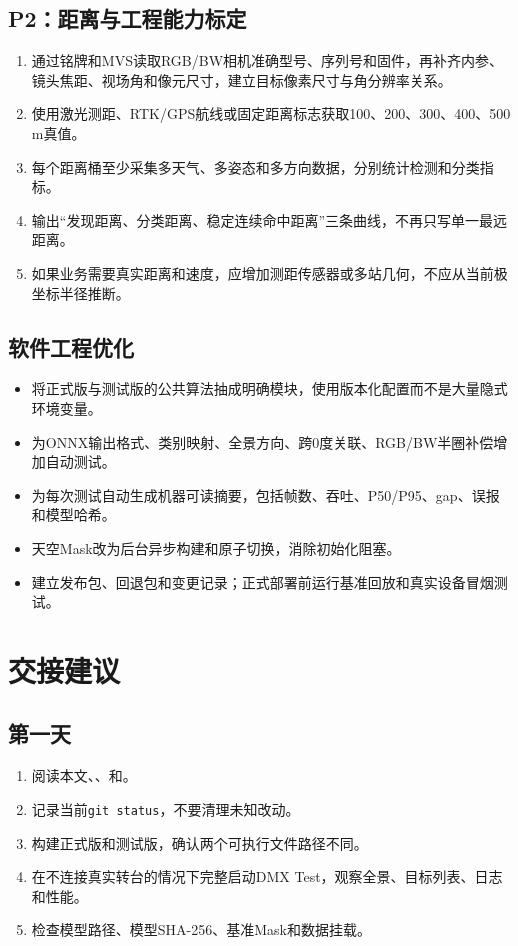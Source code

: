 \documentclass[UTF8,a4paper,11pt,openany]{ctexrep}
\begin{document}
\section{P2：距离与工程能力标定}

\begin{enumerate}
  \item 通过铭牌和MVS读取RGB/BW相机准确型号、序列号和固件，再补齐内参、镜头焦距、视场角和像元尺寸，建立目标像素尺寸与角分辨率关系。
  \item 使用激光测距、RTK/GPS航线或固定距离标志获取100、200、300、400、500 m真值。
  \item 每个距离桶至少采集多天气、多姿态和多方向数据，分别统计检测和分类指标。
  \item 输出“发现距离、分类距离、稳定连续命中距离”三条曲线，不再只写单一最远距离。
  \item 如果业务需要真实距离和速度，应增加测距传感器或多站几何，不应从当前极坐标半径推断。
\end{enumerate}

\section{软件工程优化}

\begin{itemize}
  \item 将正式版与测试版的公共算法抽成明确模块，使用版本化配置而不是大量隐式环境变量。
  \item 为ONNX输出格式、类别映射、全景方向、跨0度关联、RGB/BW半圈补偿增加自动测试。
  \item 为每次测试自动生成机器可读摘要，包括帧数、吞吐、P50/P95、gap、误报和模型哈希。
  \item 天空Mask改为后台异步构建和原子切换，消除初始化阻塞。
  \item 建立发布包、回退包和变更记录；正式部署前运行基准回放和真实设备冒烟测试。
\end{itemize}

\chapter{交接建议}

\section{第一天}

\begin{enumerate}
  \item 阅读本文、、和。
  \item 记录当前\texttt{git status}，不要清理未知改动。
  \item 构建正式版和测试版，确认两个可执行文件路径不同。
  \item 在不连接真实转台的情况下完整启动DMX Test，观察全景、目标列表、日志和性能。
  \item 检查模型路径、模型SHA-256、基准Mask和数据挂载。
\end{enumerate}
\end{document}
